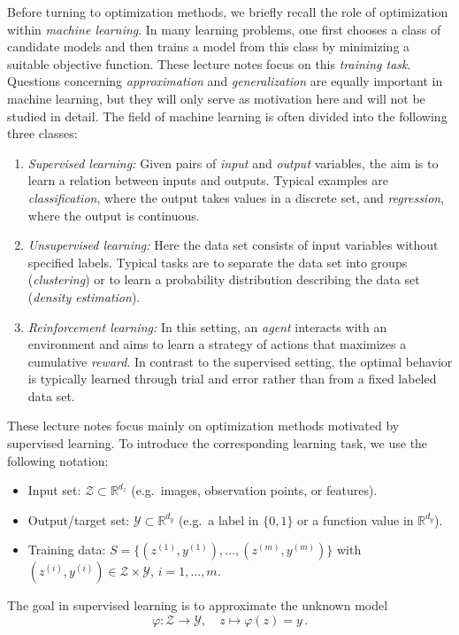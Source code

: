 \documentclass[12pt,openany]{book}
\theoremstyle{definition}
\theoremstyle{definition}
\newcommand{\cY}{\mathcal{Y}}
\newcommand{\cZ}{\mathcal{Z}}
\newcommand{\R}{\mathbb{R}}
\begin{document}
Before turning to optimization methods, we briefly recall the role of optimization within \textit{machine
learning}. In many learning problems, one first chooses a class of candidate models and then trains
a model from this class by minimizing a suitable objective function. These lecture notes focus on
this \textit{training task}. Questions concerning \textit{approximation} and \textit{generalization} are equally important
in machine learning, but they will only serve as motivation here and will not be studied in detail. The field of machine learning is often divided into the following three classes:
\begin{enumerate}
\item \textit{Supervised learning:} Given pairs of \textit{input} and \textit{output} variables, the aim is to learn a relation between inputs and outputs. Typical examples are \textit{classification}, where the output takes values in a discrete set, and \textit{regression},
where the output is continuous.
\item \textit{Unsupervised learning:} Here the data set consists of input variables without specified labels. Typical tasks are to separate the data set into groups (\textit{clustering}) or to learn a probability distribution describing the data set (\textit{density estimation}).
\item \textit{Reinforcement learning:} In this setting, an \textit{agent} interacts with an environment and aims to learn a strategy of actions that maximizes a cumulative \textit{reward}. In contrast to the supervised setting, the optimal behavior is typically learned through trial and error rather than from a fixed labeled data set.
\end{enumerate}

These lecture notes focus mainly on optimization methods motivated by supervised learning. To introduce the corresponding learning task, we use the following notation:
\begin{itemize}
    \item Input set: $\cZ \subset \R^{d_z}$ 
    (e.g.~images, observation points, or features).
    \item Output/target set: $\cY\subset\R^{d_y}$ 
    (e.g.~a label in $\{0,1\}$ or a function value in $\R^{d_y}$).
    \item Training data: 
    $S=\{(z^{(1)},y^{(1)}),\dots,(z^{(m)},y^{(m)})\}$ with
    $(z^{(i)},y^{(i)})\in\cZ\times \cY$, $i=1,\dots,m$.
\end{itemize}
The goal in supervised learning is to approximate the unknown model
\begin{equation*}
    \varphi:\cZ\to\cY,\quad z\mapsto \varphi(z)=y\,.
\end{equation*}
\end{document}
